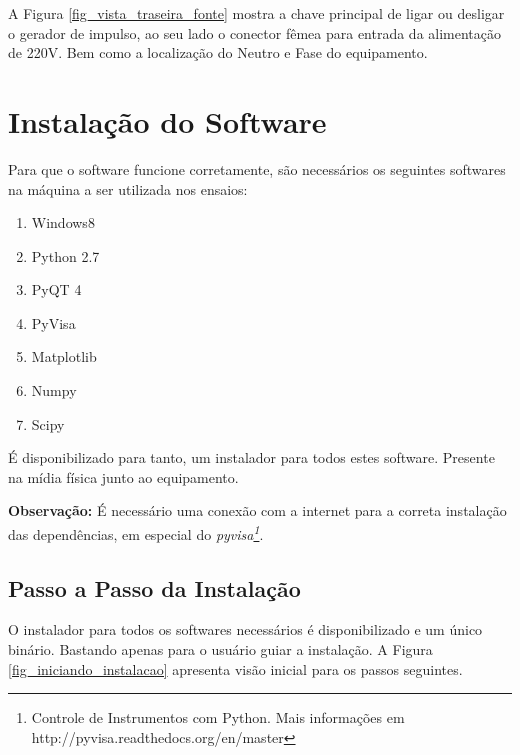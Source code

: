 \documentclass[a4paper, 10pt]{article}
\begin{document}
A Figura \ref{fig_vista_traseira_fonte} mostra a chave principal de ligar ou 
desligar o gerador de impulso, ao seu lado o conector fêmea para entrada da alimentação de 220V.
Bem como a localização do Neutro e Fase do equipamento. 




\section{Instalação do Software}

Para que o software funcione corretamente, são necessários os seguintes softwares
na máquina a ser utilizada nos ensaios:

\begin{enumerate}
    \item Windows8
    \item Python 2.7
    \item PyQT 4
    \item PyVisa
    \item Matplotlib
    \item Numpy
    \item Scipy
\end{enumerate}

É disponibilizado para tanto, um instalador para todos estes software. Presente 
na mídia física junto ao equipamento. 

\textbf{Observação:} É necessário uma conexão com a internet para a correta 
instalação das dependências, em especial do  \textit{pyvisa\footnote{Controle de Instrumentos com Python. Mais informações em http://pyvisa.readthedocs.org/en/master}}.


\subsection{Passo a Passo da Instalação}

O instalador para todos os softwares necessários é disponibilizado e um único
binário. Bastando apenas para o usuário guiar a instalação. A Figura \ref{fig_iniciando_instalacao} apresenta visão inicial para os passos seguintes.
\end{document}
